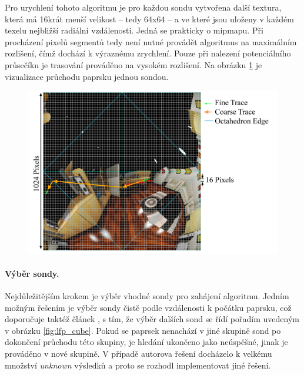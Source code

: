 Pro urychlení tohoto algoritmu je pro každou sondu vytvořena další textura, která má 16krát menší velikost -- tedy 64x64 -- a ve které jsou uloženy v každém texelu nejbližší radiální vzdálenosti. Jedná se prakticky o mipmapu. Při procházení pixelů segmentů tedy není nutné provádět algoritmus na maximálním rozlišení, čímž dochází k výraznému zrychlení. Pouze při nalezení potenciálního průsečíku je trasování prováděno na vysokém rozlišení. Na obrázku \ref{fig:lfp_trace} je vizualizace průchodu paprsku jednou sondou.

\begin{figure}[H]
	\centering
	\includegraphics[scale=0.85]{images/lfp_trace.png}
	\captionsetup{justification=centering}
	\label{fig:lfp_trace}
\end{figure}

\paragraph{Výběr sondy.} Nejdůležitějším krokem je výběr vhodné sondy pro zahájení algoritmu. Jedním možným řešením je výběr sondy čistě podle vzdálenosti k počátku paprsku, což doporučuje taktéž článek \cite{light_field_probes}, s tím, že výběr dalších sond se řídí pořadím uvedeným v obrázku \ref{fig:lfp_cube}. Pokud se paprsek nenachází v jiné skupině sond po dokončení průchodu této skupiny, je hledání ukončeno jako neúspěšné, jinak je prováděno v nové skupině. V případě autorova řešení docházelo k velkému množství \textit{unknown} výsledků a proto se rozhodl implementovat jiné řešení. 

